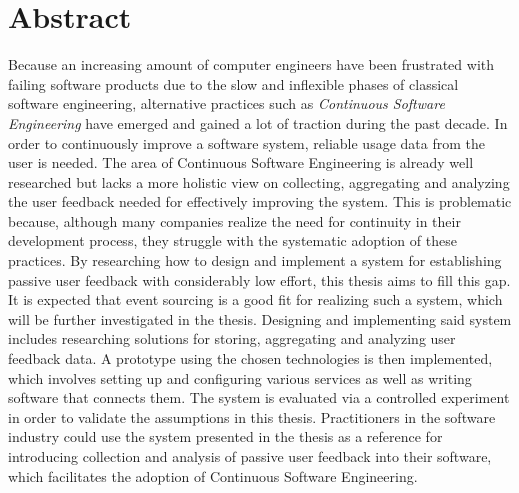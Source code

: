 %
\chapter*{Abstract}
\label{sec:abstract}
\vspace*{-10mm}

Because an increasing amount of computer engineers have been frustrated with failing software products due to the slow and inflexible phases of classical software engineering, alternative practices such as \emph{Continuous Software Engineering} have emerged and gained a lot of traction during the past decade.
In order to continuously improve a software system, reliable usage data from the user is needed.
The area of Continuous Software Engineering is already well researched but lacks a more holistic view on collecting, aggregating and analyzing the user feedback needed for effectively improving the system.
This is problematic because, although many companies realize the need for continuity in their development process, they struggle with the systematic adoption of these practices.
By researching how to design and implement a system for establishing passive user feedback with considerably low effort, this thesis aims to fill this gap.
It is expected that event sourcing is a good fit for realizing such a system, which will be further investigated in the thesis.
Designing and implementing said system includes researching solutions for storing, aggregating and analyzing user feedback data.
A prototype using the chosen technologies is then implemented, which involves setting up and configuring various services as well as writing software that connects them.
The system is evaluated via a controlled experiment in order to validate the assumptions in this thesis.
Practitioners in the software industry could use the system presented in the thesis as a reference for introducing collection and analysis of passive user feedback into their software, which facilitates the adoption of Continuous Software Engineering.
